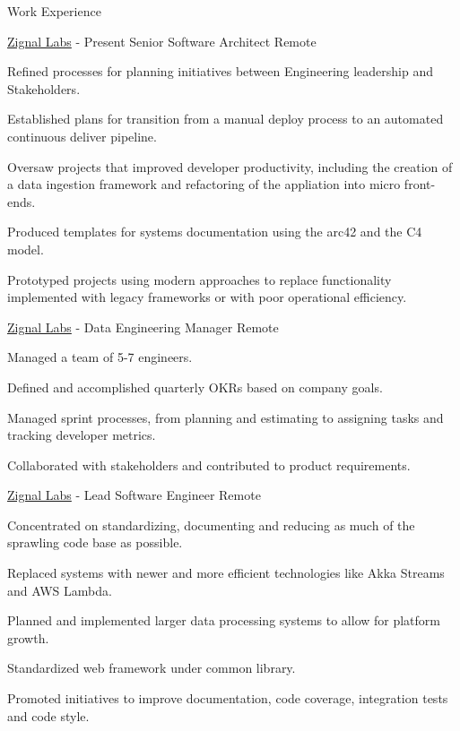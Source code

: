 \documentclass[UKenglish]{resume} %
\begin{document}
\begin{rSection}{Work Experience}
    \begin{rSubsection}
        {\href{https://www.zignallabs.com}{Zignal Labs}}
        {  - Present }
        {Senior Software Architect}
        {Remote}

        \item Refined processes for planning initiatives between Engineering leadership and Stakeholders.
        \item Established plans for transition from a manual deploy process to an automated continuous deliver pipeline.
        \item Oversaw projects that improved developer productivity, including the creation of a data ingestion framework and refactoring of the appliation into micro front-ends.
        \item Produced templates for systems documentation using the arc42 and the C4 model.
        \item Prototyped projects using modern approaches to replace functionality implemented with legacy frameworks or with poor operational efficiency.
    \end{rSubsection}

    \begin{rSubsection}
        {\href{https://www.zignallabs.com}{Zignal Labs}}
        {  -  }
        {Data Engineering Manager}
        {Remote}

        \item Managed a team of 5-7 engineers.
        \item Defined and accomplished quarterly OKRs based on company goals.
        \item Managed sprint processes, from planning and estimating to assigning tasks and tracking developer metrics.
        \item Collaborated with stakeholders and contributed to product requirements.
    \end{rSubsection}

    \begin{rSubsection}
        {\href{https://www.zignallabs.com}{Zignal Labs}}
        {  -  }
        {Lead Software Engineer}
        {Remote}

        \item Concentrated on standardizing, documenting and reducing as much of the sprawling code base as possible.
        \item Replaced systems with newer and more efficient technologies like Akka Streams and AWS Lambda.
        \item Planned and implemented larger data processing systems to allow for platform growth.
        \item Standardized web framework under common library.
        \item Promoted initiatives to improve documentation, code coverage, integration tests and code style.
    \end{rSubsection}


\end{rSection}
\end{document}

